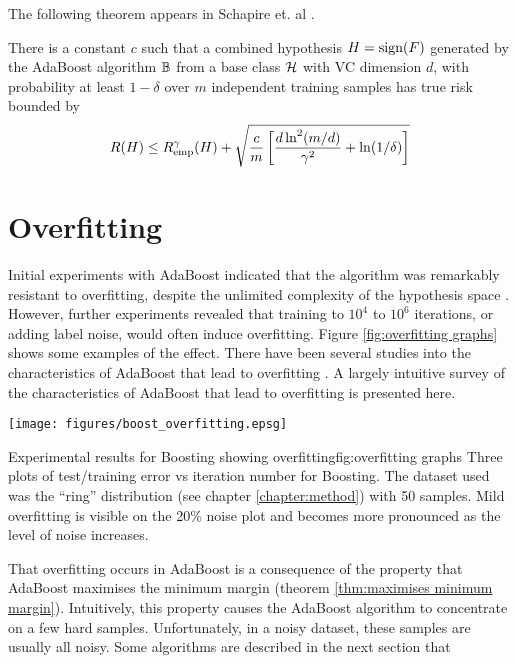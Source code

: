 The following theorem appears in Schapire et. al \cite{Schapire97}.

\begin{theorem}[Performance bound for boosting ($p$=1)]

There is a constant $c$ such that a combined hypothesis $H = \mathrm{sign}(F)$
generated by the AdaBoost algorithm $\mathbb{B}$ from a base class $\mathcal{H}$
with VC dimension $d$, with probability at least $1 - \delta$ over $m$
independent training samples has true risk bounded by 
\begin{equation}
R(H) \leq R_{\mathrm{emp}}^{\gamma}(H) + \sqrt{\frac{c}{m} \left[ \frac{d
\ln^2 (m/d)}{\gamma^2} + \ln(1/\delta) \right] }
\end{equation}
\end{theorem}


\section{Overfitting}
\label{sec:boost overfitting}

Initial experiments with AdaBoost indicated that the algorithm was
remarkably resistant to overfitting, despite the unlimited complexity
of the hypothesis space \cite{Freund96}.
However, further experiments \cite{Grove98, Bauer99} revealed that
training to $10^4$ to $10^6$ iterations, or adding label noise, would
often induce overfitting.  Figure \ref{fig:overfitting graphs} shows some
examples of the effect.  There have been several studies into the
characteristics of AdaBoost that lead to overfitting \cite{Schapire97,
Grove98, Ratsch98}.  A largely intuitive survey of the characteristics
of AdaBoost that lead to overfitting is presented here. 

\begin{linefigure}
\begin{center}
\texttt{[image: figures/boost\_overfitting.epsg]}
\end{center}
\begin{capt}{Experimental results for Boosting showing
overfitting}{fig:overfitting graphs}
Three plots of test/training error vs iteration number for Boosting.
The dataset used was the ``ring'' distribution (see chapter
\ref{chapter:method}) with 50 samples.  Mild overfitting is visible on
the 20\% noise plot and becomes more pronounced as the level of noise
increases.
\end{capt}
\end{linefigure}

That overfitting occurs in AdaBoost is a consequence of the property
that AdaBoost maximises the minimum margin (theorem
\ref{thm:maximises minimum margin}).  Intuitively, this property
causes the  AdaBoost algorithm to concentrate on a few hard
samples.  Unfortunately, in a noisy dataset, these samples are usually
all noisy.  Some algorithms are described in the next section that  

